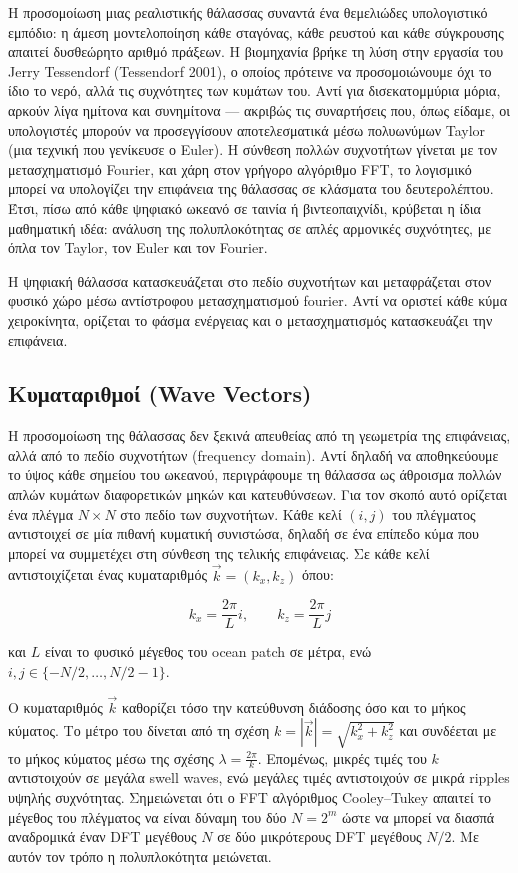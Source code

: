 \documentclass[a4paper, 11pt]{article}
\begin{document}
Η προσομοίωση μιας ρεαλιστικής θάλασσας συναντά ένα θεμελιώδες
υπολογιστικό εμπόδιο: η άμεση μοντελοποίηση κάθε σταγόνας, κάθε ρευστού
και κάθε σύγκρουσης απαιτεί δυσθεώρητο αριθμό πράξεων. Η βιομηχανία
βρήκε τη λύση στην εργασία του Jerry Tessendorf (Tessendorf 2001), ο
οποίος πρότεινε να προσομοιώνουμε όχι το ίδιο το νερό, αλλά τις
συχνότητες των κυμάτων του. Αντί για δισεκατομμύρια μόρια, αρκούν λίγα
ημίτονα και συνημίτονα --- ακριβώς τις συναρτήσεις που, όπως είδαμε, οι
υπολογιστές μπορούν να προσεγγίσουν αποτελεσματικά μέσω πολυωνύμων
Taylor (μια τεχνική που γενίκευσε ο Euler). Η σύνθεση πολλών συχνοτήτων
γίνεται με τον μετασχηματισμό Fourier, και χάρη στον γρήγορο αλγόριθμο
FFT, το λογισμικό μπορεί να υπολογίζει την επιφάνεια της θάλασσας σε
κλάσματα του δευτερολέπτου. Έτσι, πίσω από κάθε ψηφιακό ωκεανό σε ταινία
ή βιντεοπαιχνίδι, κρύβεται η ίδια μαθηματική ιδέα: ανάλυση της
πολυπλοκότητας σε απλές αρμονικές συχνότητες, με όπλα τον Taylor, τον
Euler και τον Fourier.

Η ψηφιακή θάλασσα κατασκευάζεται στο πεδίο συχνοτήτων και μεταφράζεται
στον φυσικό χώρο μέσω αντίστροφου μετασχηματισμού fourier. Αντί να
οριστεί κάθε κύμα χειροκίνητα, ορίζεται το φάσμα ενέργειας και ο
μετασχηματισμός κατασκευάζει την επιφάνεια.

\subsection{Κυματαριθμοί (Wave
Vectors)}\label{ux3baux3c5ux3bcux3b1ux3c4ux3b1ux3c1ux3b9ux3b8ux3bcux3bfux3af-wave-vectors}

Η προσομοίωση της θάλασσας δεν ξεκινά απευθείας από τη γεωμετρία της
επιφάνειας, αλλά από το πεδίο συχνοτήτων (frequency domain). Αντί δηλαδή
να αποθηκεύουμε το ύψος κάθε σημείου του ωκεανού, περιγράφουμε τη
θάλασσα ως άθροισμα πολλών απλών κυμάτων διαφορετικών μηκών και
κατευθύνσεων. Για τον σκοπό αυτό ορίζεται ένα πλέγμα \(N \times N\) στο
πεδίο των συχνοτήτων. Κάθε κελί \((i,j)\) του πλέγματος αντιστοιχεί σε
μία πιθανή κυματική συνιστώσα, δηλαδή σε ένα επίπεδο κύμα που μπορεί να
συμμετέχει στη σύνθεση της τελικής επιφάνειας. Σε κάθε κελί
αντιστοιχίζεται ένας κυματαριθμός \(\vec{k} = (k_x, k_z)\) όπου:

\[
k_x = \frac{2\pi}{L}i,
\qquad
k_z = \frac{2\pi}{L}j
\]

και \(L\) είναι το φυσικό μέγεθος του ocean patch σε μέτρα, ενώ
\(i,j \in \{-N/2,\dots,N/2-1\}\).

Ο κυματαριθμός \(\vec{k}\) καθορίζει τόσο την κατεύθυνση διάδοσης όσο
και το μήκος κύματος. Το μέτρο του δίνεται από τη σχέση
\(k = |\vec{k}| = \sqrt{k_x^2 + k_z^2}\) και συνδέεται με το μήκος
κύματος μέσω της σχέσης \(\lambda = \frac{2\pi}{k}\). Επομένως, μικρές
τιμές του \(k\) αντιστοιχούν σε μεγάλα swell waves, ενώ μεγάλες τιμές
αντιστοιχούν σε μικρά ripples υψηλής συχνότητας. Σημειώνεται ότι ο FFT
αλγόριθμος Cooley--Tukey απαιτεί το μέγεθος του πλέγματος να είναι
δύναμη του δύο \(N = 2^m\) ώστε να μπορεί να διασπά αναδρομικά έναν DFT
μεγέθους \(N\) σε δύο μικρότερους DFT μεγέθους \(N/2\). Με αυτόν τον
τρόπο η πολυπλοκότητα μειώνεται.
\end{document}
